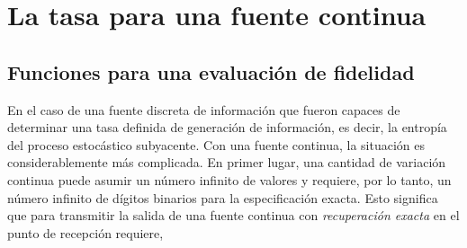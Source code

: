 \chapter{La tasa para una fuente continua}

\section{Funciones para una evaluaci\'on de fidelidad}

En el caso de una fuente discreta de informaci\'on que fueron capaces
de determinar una tasa definida de generaci\'on de informaci\'on, es
decir, la entrop\'ia del proceso estoc\'astico subyacente. Con una
fuente continua, la situaci\'on es considerablemente m\'as
complicada. En primer lugar, una cantidad de variaci\'on continua
puede asumir un n\'umero infinito de valores y requiere, por lo
tanto, un n\'umero infinito de d\'igitos binarios para la
especificaci\'on exacta. Esto significa que para transmitir la salida
de una fuente continua con {\em recuperaci\'on exacta} en el punto
de recepci\'on requiere,
